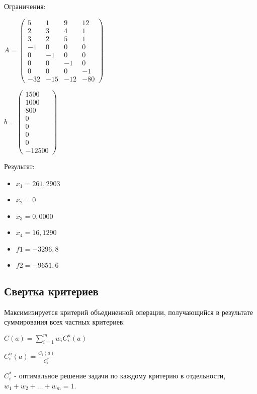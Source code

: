 Ограничения:

$A =
\begin{pmatrix}
  5 & 1 & 9 & 12 \\
  2 & 3 & 4 & 1 \\
  3 & 2 & 5 & 1 \\
  -1& 0 & 0 & 0 \\
  0 &-1 & 0 & 0 \\
  0 & 0 &-1 & 0 \\
  0 & 0 & 0 & -1 \\
  -32 & -15 & -12 & -80
\end{pmatrix}$

$b =
\begin{pmatrix}
  1500 \\
  1000 \\
  800 \\
  0 \\
  0 \\
  0 \\
  0 \\
  -12500
\end{pmatrix}$




Результат:
\begin{itemize}
\item $x_1 = 261,2903$
\item $x_2 = 0$
\item $x_3 = 0,0000$
\item $x_4 = 16,1290$
\item $f1 = -3296,8$
\item $f2 = -9651,6$
\end{itemize}

\subsection{Свертка критериев}

Максимизируется критерий объединенной операции, получающийся в результате суммирования всех частных критериев:

$C(a)=\sum\limits_{i=1}^m w_i C_i^n (a)$

$C_i^n (a)=\frac{C_i (a)}{C_i^*}$

$C_i^*$ - оптимальное решение задачи по каждому критерию в отдельности, $w_1+w_2+\dots+w_m=1$.



